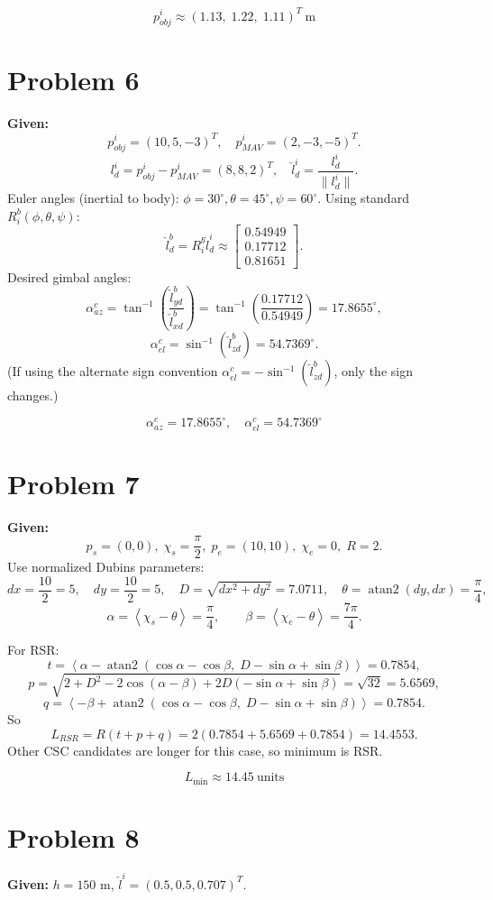 \documentclass[11pt,a4paper]{article}
\newcommand{\wrap}[1]{\left\langle #1 \right\rangle}
\begin{document}
\[
\boxed{p_{obj}^i\approx(1.13,\;1.22,\;1.11)^T~\text{m}}
\]

\section{Problem 6}
\textbf{Given:}
\[
p_{obj}^i=(10,5,-3)^T,\quad p_{MAV}^i=(2,-3,-5)^T.
\]
\[
l_d^i=p_{obj}^i-p_{MAV}^i=(8,8,2)^T,\quad
\check l_d^i=\frac{l_d^i}{\|l_d^i\|}.
\]
Euler angles (inertial to body): $\phi=30^\circ,\theta=45^\circ,\psi=60^\circ$.
Using standard $R_i^b(\phi,\theta,\psi)$:
\[
\check l_d^b=R_i^b\check l_d^i
\approx
\begin{bmatrix}
0.54949\\0.17712\\0.81651
\end{bmatrix}.
\]
Desired gimbal angles:
\[
\alpha_{az}^c=\tan^{-1}\!\left(\frac{\check l_{yd}^b}{\check l_{xd}^b}\right)
=\tan^{-1}\!\left(\frac{0.17712}{0.54949}\right)=17.8655^\circ,
\]
\[
\alpha_{el}^c=\sin^{-1}(\check l_{zd}^b)=54.7369^\circ.
\]
(If using the alternate sign convention $\alpha_{el}^c=-\sin^{-1}(\check l_{zd}^b)$, only the sign changes.)

\[
\boxed{\alpha_{az}^c=17.8655^\circ,\quad \alpha_{el}^c=54.7369^\circ}
\]

\section{Problem 7}
\textbf{Given:}
\[
p_s=(0,0),\; \chi_s=\frac{\pi}{2},\;
p_e=(10,10),\; \chi_e=0,\; R=2.
\]
Use normalized Dubins parameters:
\[
dx=\frac{10}{2}=5,\quad dy=\frac{10}{2}=5,\quad
D=\sqrt{dx^2+dy^2}=7.0711,\quad
\theta=\operatorname{atan2}(dy,dx)=\frac{\pi}{4},
\]
\[
\alpha=\wrap{\chi_s-\theta}=\frac{\pi}{4},\qquad
\beta=\wrap{\chi_e-\theta}=\frac{7\pi}{4}.
\]

For RSR:
\[
t=\wrap{\alpha-\operatorname{atan2}(\cos\alpha-\cos\beta,\;D-\sin\alpha+\sin\beta)}
=0.7854,
\]
\[
p=\sqrt{2+D^2-2\cos(\alpha-\beta)+2D(-\sin\alpha+\sin\beta)}
=\sqrt{32}=5.6569,
\]
\[
q=\wrap{-\beta+\operatorname{atan2}(\cos\alpha-\cos\beta,\;D-\sin\alpha+\sin\beta)}
=0.7854.
\]
So
\[
L_{RSR}=R(t+p+q)=2(0.7854+5.6569+0.7854)=14.4553.
\]
Other CSC candidates are longer for this case, so minimum is RSR.

\[
\boxed{L_{\min}\approx 14.45~\text{units}}
\]

\section{Problem 8}
\textbf{Given:}
$h=150$ m, $\check l^i=(0.5,0.5,0.707)^T$.
\end{document}

